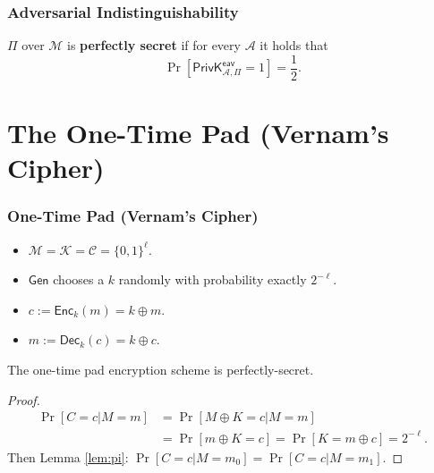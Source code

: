 \begin{frame}\frametitle{Adversarial Indistinguishability}
\begin{definition}
$\Pi$ over $\mathcal{M}$ is \textbf{perfectly secret} if for every $\mathcal{A}$ it holds that
\[ \Pr[\mathsf{PrivK}^{\mathsf{eav}}_{\mathcal{A},\Pi}=1] = \frac{1}{2}.\]
\end{definition}
\end{frame}
\section{The One-Time Pad (Vernam's Cipher)}
\begin{frame}\frametitle{One-Time Pad (Vernam's Cipher)}
\begin{itemize}
	\item $\mathcal{M} = \mathcal{K} = \mathcal{C} = \{0,1\}^{\ell}$.
	\item $\mathsf{Gen}$ chooses a $k$ randomly with probability exactly $2^{-\ell}$.
	\item $c := \mathsf{Enc}_k(m) = k \oplus m$. 
	\item $m := \mathsf{Dec}_k(c) = k \oplus c$. 
\end{itemize}
\begin{theorem}
The one-time pad encryption scheme is perfectly-secret.
\end{theorem}
\begin{proof}
\[\begin{split} \Pr[C=c|M=m] &= \Pr[M \oplus K=c|M=m] \\
&= \Pr[m \oplus K=c] = \Pr[K = m \oplus c] = 2^{-\ell}.
\end{split}
\]
Then Lemma \ref{lem:pi}: $\Pr[C=c | M=m_0] = \Pr[C=c | M=m_1]$.
\end{proof}
\end{frame}

